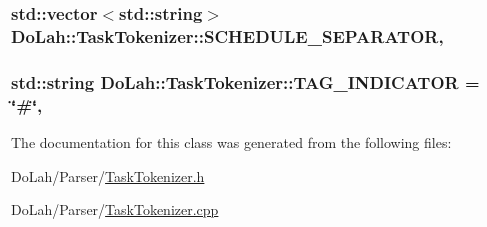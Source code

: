 \subsubsection[{S\+C\+H\+E\+D\+U\+L\+E\+\_\+\+S\+E\+P\+A\+R\+A\+T\+O\+R}]{\setlength{\rightskip}{0pt plus 5cm}std\+::vector$<$std\+::string$>$ Do\+Lah\+::\+Task\+Tokenizer\+::\+S\+C\+H\+E\+D\+U\+L\+E\+\_\+\+S\+E\+P\+A\+R\+A\+T\+O\+R\hspace{0.3cm}{\ttfamily [static]}, {\ttfamily [private]}}\label{class_do_lah_1_1_task_tokenizer_ab0ffb0a1a7b6ef69807a106422bc2796}
\hypertarget{class_do_lah_1_1_task_tokenizer_ac2e862c393876c5b0d5586e3eaad36e8}{}
\subsubsection[{T\+A\+G\+\_\+\+I\+N\+D\+I\+C\+A\+T\+O\+R}]{\setlength{\rightskip}{0pt plus 5cm}std\+::string Do\+Lah\+::\+Task\+Tokenizer\+::\+T\+A\+G\+\_\+\+I\+N\+D\+I\+C\+A\+T\+O\+R = \char`\"{}\#\char`\"{}\hspace{0.3cm}{\ttfamily [static]}, {\ttfamily [private]}}\label{class_do_lah_1_1_task_tokenizer_ac2e862c393876c5b0d5586e3eaad36e8}


The documentation for this class was generated from the following files\+:\begin{DoxyCompactItemize}
\item 
Do\+Lah/\+Parser/\hyperlink{_task_tokenizer_8h}{Task\+Tokenizer.\+h}\item 
Do\+Lah/\+Parser/\hyperlink{_task_tokenizer_8cpp}{Task\+Tokenizer.\+cpp}\end{DoxyCompactItemize}
